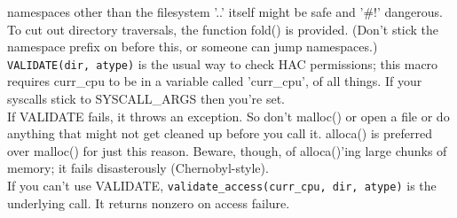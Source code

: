 \documentclass[a4paper,oneside,openany]{book}
\begin{document}
namespaces other than the filesystem '..' itself might be safe and '\#!'
dangerous. To cut out directory traversals, the function fold() is
provided. (Don't stick the namespace prefix on before this, or someone
can jump namespaces.)
\smallskip\\
\texttt{VALIDATE(dir, atype)} is the usual way to check HAC permissions;
this macro requires curr\_cpu to be in a variable called 'curr\_cpu', of
all things. If your syscalls stick to SYSCALL\_ARGS then you're set.
\smallskip\\
If VALIDATE fails, it throws an exception. So don't malloc() or open a file
or do anything that might not get cleaned up before you call it. alloca() is
preferred over malloc() for just this reason. Beware, though, of alloca()'ing
large chunks of memory; it fails disasterously (Chernobyl-style).
\smallskip\\
If you can't use VALIDATE, \texttt{validate\_access(curr\_cpu, dir, atype)}
is the underlying call. It returns nonzero on access failure.
\end{document}
